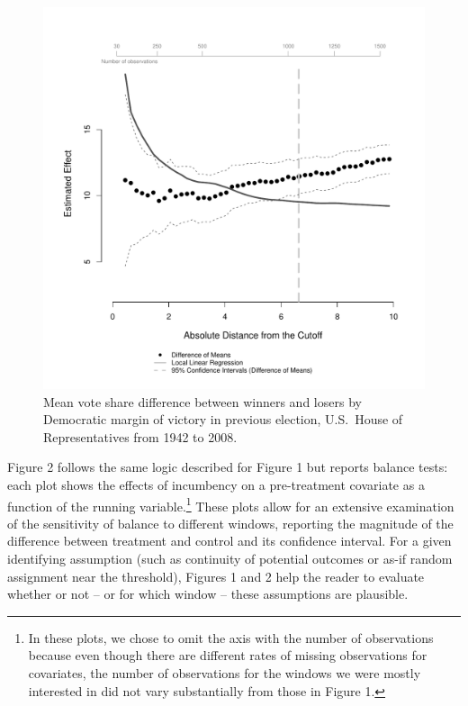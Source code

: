 \documentclass[letterpaper,twoside,12pt]{article}\usepackage[]{graphicx}\usepackage[]{color}
\begin{document}
\clearpage
\begin{figure}
  \caption{Mean vote share difference between winners and losers by Democratic margin of victory in previous election, U.S.\ House of Representatives from 1942 to 2008.}\label{fig:main_est_add}
\vspace{-1mm}
  \centerline{\includegraphics[width=1\textwidth]{with_add_est_plot.pdf}}
  \end{figure}
\clearpage

Figure 2 follows the same logic described for Figure 1 but reports balance tests: each plot shows the effects of incumbency on a pre-treatment covariate as a function of the running variable.\footnote{In these plots, we chose to omit the axis with the number of observations because even though there are different rates of missing observations for covariates, the number of observations for the windows we were mostly interested in did not vary substantially from those in Figure 1.} These plots allow for an extensive examination of the sensitivity of balance to different windows, reporting the magnitude of the difference between treatment and control and its confidence interval. For a given identifying assumption (such as continuity of potential outcomes or as-if random assignment near the threshold), Figures 1 and 2  help the reader to evaluate whether or not -- or for which window -- these assumptions are plausible.
\end{document}
